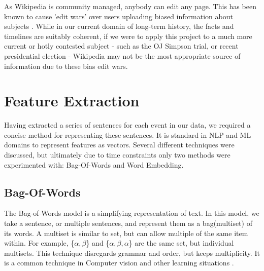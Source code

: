 \documentclass[bsc,frontabs,twoside,singlespacing,parskip,deptreport]{infthesis}     %
\begin{document}
As Wikipedia is community managed, anybody can edit any page. This has been known to cause 'edit wars' over users
uploading biased information about subjects \cite{}.
While in our current domain of long-term history, the facts and timelines are suitably coherent, if we were to apply this project
to a much more current or hotly contested subject - such as the OJ Simpson trial, or recent presidential election - Wikipedia
may not be the most appropriate source of information due to these bias edit wars.


\section{Feature Extraction}\label{sec:representation}
Having extracted a series of sentences for each event in our data, we required a concise method
for representing these sentences. It is standard in NLP and ML domains to represent features as vectors.
Several different techniques were discussed, but ultimately due to time constraints only two methods were
experimented with: Bag-Of-Words and Word Embedding.
\subsection{Bag-Of-Words}
The Bag-of-Words model is a simplifying representation of text.
In this model, we take a sentence, or multiple sentences, and represent them as a bag(multiset) of its words.
A multiset is similar to set, but can allow multiple of the same item within.
For example, \{$\alpha,\beta$\} and \{$\alpha,\beta,\alpha$\} are the same set, but individual multisets.
This technique disregards grammar and order, but keeps multiplicity. It is a common technique in Computer vision
and other learning situations \cite{sivic2009efficient}.
\end{document}
